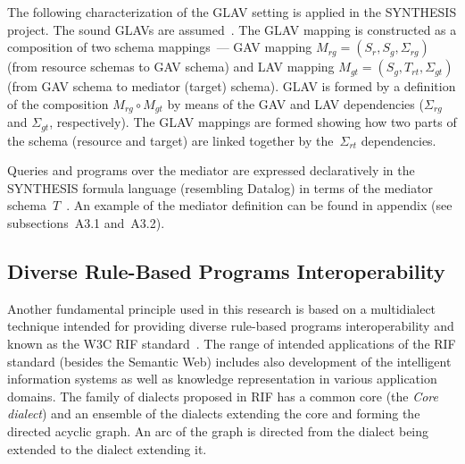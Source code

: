 \begin{multicols}{2}
  The following characterization of the GLAV setting is applied in the SYNTHESIS
project. The sound GLAVs are assumed~\cite{18-kal}. The GLAV mapping is
constructed as a composition of two schema mappings~--- GAV mapping $M_{{rg}} =
(S_r, S_{g}, \Sigma_{{rg}})$ (from resource schemas to GAV schema) and LAV mapping
$M_{{gt}} = (S_{g}, T_{{rt}}, \Sigma_{{gt}})$ (from GAV schema to mediator (target)
schema). GLAV is formed by a definition of the composition $M_{{rg}}\circ M_{{gt}}$ by
means of the GAV and LAV dependencies ($\Sigma_{{rg}}$ and $\Sigma_{{gt}}$,
respectively). The GLAV mappings are formed showing how two parts of the schema
(resource and target) are linked together by the~$\Sigma_{{rt}}$ dependencies.

  Queries and programs over the mediator are expressed declaratively in the
SYNTHESIS formula language (resembling Datalog) in terms of the mediator
schema~$T$~\cite{4-kal}. An example of the mediator definition can be found in
appendix (see subsections~A3.1 and~A3.2).

\subsection{Diverse Rule-Based Programs Interoperability}

  \noindent
  Another fundamental principle used in this research is based on a multidialect technique
intended for providing diverse rule-based programs interoperability and known as the
W3C RIF standard~\cite{8-kal}. The range of intended
applications of the RIF standard (besides the Semantic Web) includes also
development of the intelligent information systems as well as knowledge
representation in various application domains. The family of dialects proposed in RIF
has a common core (the \textit{Core dialect}) and an ensemble of the dialects
extending the core and forming the directed acyclic graph. An arc of the graph is
directed from the dialect being extended to the dialect extending it.


\end{multicols}
